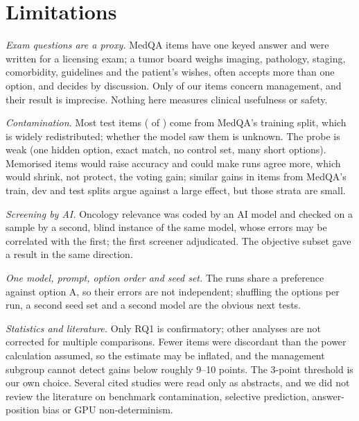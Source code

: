 \section{Limitations}\label{sec:limitations}
\emph{Exam questions are a proxy.} MedQA items have one keyed answer and were written for a licensing exam; a tumor
board weighs imaging, pathology, staging, comorbidity, guidelines and the patient's wishes, often accepts more than one
option, and decides by discussion. Only \nM{} of our \nTest{} items concern management, and their result is imprecise.
Nothing here measures clinical usefulness or safety.

\emph{Contamination.} Most test items (\nOriginTrain{} of \nTest) come from MedQA's training split, which is widely
redistributed; whether the model saw them is unknown. The probe is weak (one hidden option, exact match, no control
set, many short options). Memorised items would raise accuracy and could make runs agree more, which would shrink, not
protect, the voting gain; similar gains in items from MedQA's train, dev and test splits argue against a large effect,
but those strata are small.

\emph{Screening by AI.} Oncology relevance was coded by an AI model and checked on a sample by a second, blind instance of
the same model, whose errors may be correlated with the first; the first screener adjudicated. The objective subset
gave a result in the same direction.

\emph{One model, prompt, option order and seed set.} The runs share a preference against option A, so their errors
are not independent; shuffling the options per run, a second seed set and a second model are the obvious next tests.

\emph{Statistics and literature.} Only RQ1 is confirmatory; other analyses are not corrected for multiple comparisons.
Fewer items were discordant than the power calculation assumed, so the estimate may be inflated, and the management
subgroup cannot detect gains below roughly 9--10 points. The 3-point threshold is our own choice. Several cited studies
were read only as abstracts, and we did not review the literature on benchmark contamination, selective prediction,
answer-position bias or GPU non-determinism.
